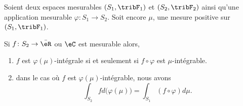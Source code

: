 \begin{theorem}      \label{THOooVADUooLiRfGK}
	Soient deux espaces mesurables \( (S_1,\tribF_1)\) et \( (S_2,\tribF_2)\) ainsi qu'une application mesurable \( \varphi\colon S_1\to S_2\). Soit encore \( \mu\), une mesure positive sur \( (S_1,\tribF_1)\).

	Si \( f\colon S_2\to\bar \eR\) ou \( \eC\) est mesurable alors,
	\begin{enumerate}
		\item      \label{ItemooKMBIooZpHJSS}
		      \( f\) est \( \varphi(\mu)\)-intégrale si et seulement si \( f\circ\varphi\) est \( \mu\)-intégrable.
		\item       \label{ItemooLAPYooUreDEl}
		      dans le cas où \( f\) est \( \varphi(\mu)\)-intégrable, nous avons
		      \begin{equation}        \label{EqooSOHXooXSbdoy}
			      \int_{S_2}fd\big( \varphi(\mu) \big)=\int_{S_1}(f\circ\varphi)d\mu.
		      \end{equation}
	\end{enumerate}
\end{theorem}

